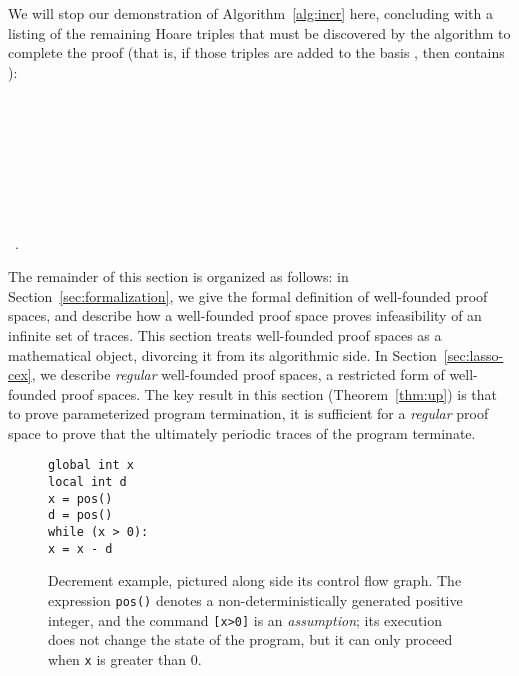 \documentclass[9pt,nocopyrightspace]{sigplanconf}
\theoremstyle{definition}
\begin{document}
We will stop our demonstration of Algorithm~\ref{alg:incr} here, concluding
with a listing of the remaining Hoare triples that must be discovered by the
algorithm to complete the proof (that is, if those triples are added to the
basis , then  contains ):
\begin{center}
    \\
    \\
    \\
    \\
    \\
    \\
    \\
    \ .
  \end{center}

The remainder of this section is organized as follows: in
Section~\ref{sec:formalization}, we give the formal definition of well-founded
proof spaces, and describe how a well-founded proof space proves infeasibility
of an infinite set of traces.  This section treats well-founded proof spaces
as a mathematical object, divorcing it from its algorithmic side.  In
Section~\ref{sec:lasso-cex}, we describe \emph{regular} well-founded proof
spaces, a restricted form of well-founded proof spaces.  The key result in
this section (Theorem~\ref{thm:up}) is that to prove parameterized program
termination, it is sufficient for a \emph{regular} proof space to prove that
the ultimately periodic traces of the program terminate.

\begin{figure}
  \begin{minipage}[b]{2.4cm}
    \texttt{global int x}\\
    \texttt{local int d}\\
    \texttt{x = pos()}\\
    \texttt{d = pos()}\\
      \texttt{while (x > 0):}\\
      \hspace*{0.25cm}\texttt{x = x - d}
  \end{minipage}
  \hfill
  \begin{minipage}[b]{6cm}
    \flushright
  \end{minipage}
\caption{Decrement example, pictured along side its control flow graph.  The
  expression \texttt{pos()} denotes a non-deterministically generated positive
  integer, and the command \texttt{[x>0]} is an \emph{assumption}; its execution does not change the state of the program, but it can only proceed when \texttt{x} is greater than 0. \label{fig:incdec}}
\end{figure}
\end{document}
